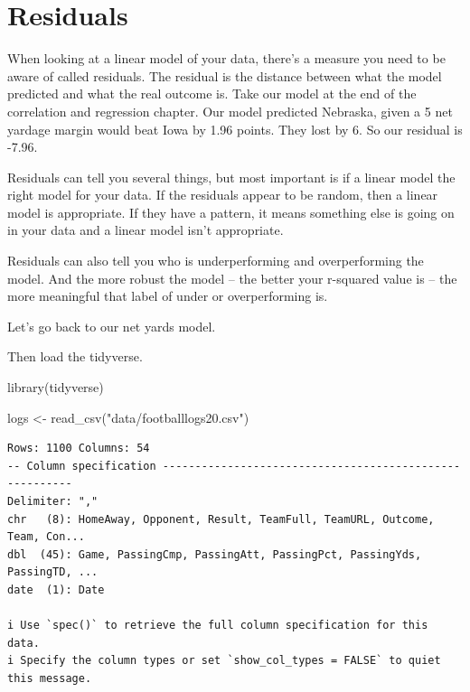 \documentclass[
  letterpaper,
  DIV=11,
  numbers=noendperiod]{scrreprt}
\newenvironment{Shaded}{\begin{snugshade}}{\end{snugshade}}
\newcommand{\FunctionTok}[1]{\textcolor[rgb]{0.28,0.35,0.67}{#1}}
\newcommand{\NormalTok}[1]{\textcolor[rgb]{0.00,0.23,0.31}{#1}}
\newcommand{\OtherTok}[1]{\textcolor[rgb]{0.00,0.23,0.31}{#1}}
\newcommand{\StringTok}[1]{\textcolor[rgb]{0.13,0.47,0.30}{#1}}
\begin{document}

\hypertarget{residuals}{%
\chapter{Residuals}\label{residuals}}

When looking at a linear model of your data, there's a measure you need
to be aware of called residuals. The residual is the distance between
what the model predicted and what the real outcome is. Take our model at
the end of the correlation and regression chapter. Our model predicted
Nebraska, given a 5 net yardage margin would beat Iowa by 1.96 points.
They lost by 6. So our residual is -7.96.

Residuals can tell you several things, but most important is if a linear
model the right model for your data. If the residuals appear to be
random, then a linear model is appropriate. If they have a pattern, it
means something else is going on in your data and a linear model isn't
appropriate.

Residuals can also tell you who is underperforming and overperforming
the model. And the more robust the model -- the better your r-squared
value is -- the more meaningful that label of under or overperforming
is.

Let's go back to our net yards model.

Then load the tidyverse.

\begin{Shaded}
\begin{Highlighting}[]
\FunctionTok{library}\NormalTok{(tidyverse)}
\end{Highlighting}
\end{Shaded}

\begin{Shaded}
\begin{Highlighting}[]
\NormalTok{logs }\OtherTok{\textless{}{-}} \FunctionTok{read\_csv}\NormalTok{(}\StringTok{"data/footballlogs20.csv"}\NormalTok{)}
\end{Highlighting}
\end{Shaded}

\begin{verbatim}
Rows: 1100 Columns: 54
-- Column specification --------------------------------------------------------
Delimiter: ","
chr   (8): HomeAway, Opponent, Result, TeamFull, TeamURL, Outcome, Team, Con...
dbl  (45): Game, PassingCmp, PassingAtt, PassingPct, PassingYds, PassingTD, ...
date  (1): Date

i Use `spec()` to retrieve the full column specification for this data.
i Specify the column types or set `show_col_types = FALSE` to quiet this message.
\end{verbatim}
\end{document}
